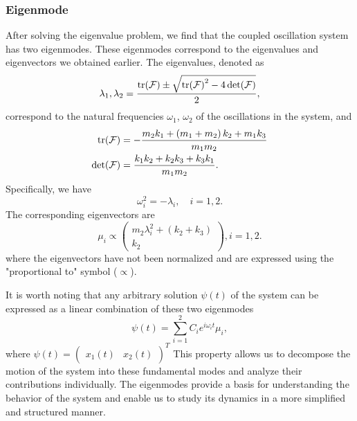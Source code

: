 \documentclass[a4paper, reprint, showkeys, nofootinbib,twoside]{revtex4-1}
\begin{document}
	\subsubsection{Eigenmode}
	After solving the eigenvalue problem, we find that the coupled oscillation system has two eigenmodes. These eigenmodes correspond to the eigenvalues and eigenvectors we obtained earlier. The eigenvalues, denoted as 
	\begin{equation}
	\lambda_{1},\lambda_{2} = \frac{\tr(\mathcal{F}) \pm \sqrt{\tr(\mathcal{F})^2-4\det({\mathcal{F}})}}{2},
	\end{equation}
	correspond to the natural frequencies $\omega_1$, $\omega_2$ of the oscillations in the system, and 
	\begin{equation}
	\begin{aligned}
	\tr(\mathcal{F}) &=-\frac{m_2k_1+\left(m_1+m_2\right)k_2+m_1k_3}{m_1m_2}
	 \\
	  \det(\mathcal{F}) &=\frac{k_1k_2+k_2k_3+k_3k_1}{m_1m_2}.
	 \end{aligned}
	\end{equation}
	Specifically, we have
	\begin{equation}
	\omega_i^2 = -\lambda_i, \quad i=1,2.
	\end{equation}
	The corresponding eigenvectors are
	\begin{equation}
	\mu_i \propto \begin{pmatrix}
	  	\displaystyle  m_2 \lambda_i^2+ \left(k_2+k_3\right)\\
		\displaystyle  k_2
		\end{pmatrix}, i=1,2.
	\end{equation}
	where the eigenvectors have not been normalized and are expressed using the "proportional to" symbol ($\propto$).
	
	It is worth noting that any arbitrary solution $\psi\left(t\right)$ of the system can be expressed as a linear combination of these two eigenmodes
	\begin{equation}\label{eq:summation expansion}
	\psi\left(t\right) = \sum_{i=1}^{2}C_i e^{i\omega_i t} \mu_i,
	\end{equation}
	where $\psi\left(t\right) = \begin{pmatrix}x_1\left(t\right)&x_2\left(t\right)\end{pmatrix}^T$
	This property allows us to decompose the motion of the system into these fundamental modes and analyze their contributions individually. The eigenmodes provide a basis for understanding the behavior of the system and enable us to study its dynamics in a more simplified and structured manner.
\end{document}
